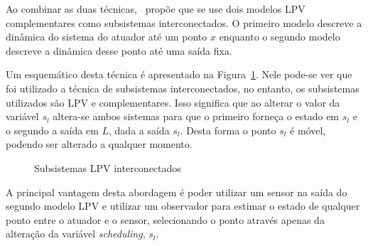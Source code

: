Ao combinar as duas técnicas,~\textcite{masterthesis:nelson} propõe que se use
dois modelos \ac{LPV} complementares como subsistemas interconectados. O
primeiro modelo descreve a dinâmica do sistema do atuador até um ponto \( x \)
enquanto o segundo modelo descreve a dinâmica desse ponto até uma saída fixa.

Um esquemático desta técnica é apresentado na Figura~\ref{fig:nelson-system}.
Nele pode-se ver que foi utilizado a técnica de subsistemas interconectados, no
entanto, os subsistemas utilizados são \ac{LPV} e complementares. Isso significa
que ao alterar o valor da variável \( s_l \) altera-se ambos sistemas para que o
primeiro forneça o estado em \( s_l \) e o segundo a saída em \( L \), dada a
saída \( s_l \). Desta forma o ponto \( s_l \) é móvel, podendo ser alterado a
qualquer momento.

\begin{figure}[ht!]
	\centering
	\captionsetup{justification=centering}
	\caption{Subsistemas LPV interconectados}%
	\label{fig:nelson-system}
\end{figure}

A principal vantagem desta abordagem é poder utilizar um sensor na saída do
segundo modelo LPV e utilizar um observador para estimar o estado de qualquer
ponto entre o atuador e o sensor, selecionando o ponto através apenas da
alteração da variável \textit{scheduling}, \( s_l \).

